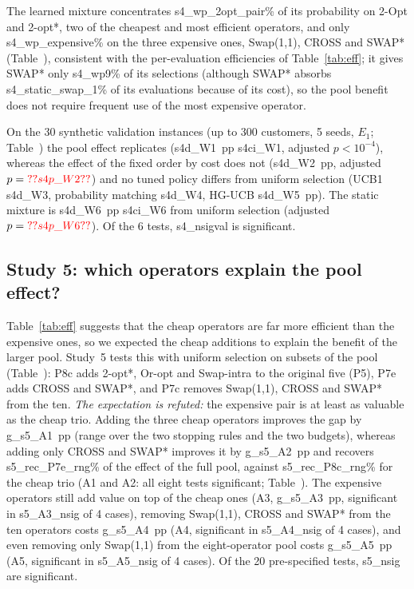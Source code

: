 The learned mixture concentrates \num{s4_wp_2opt_pair}\% of its probability on 2-Opt and 2-opt*, two of the cheapest and most efficient operators, and only \num{s4_wp_expensive}\% on the three expensive ones, Swap(1,1), CROSS and SWAP* (Table~), consistent with the per-evaluation efficiencies of Table~\ref{tab:eff}; it gives SWAP* only \num{s4_wp9}\% of its selections (although SWAP* absorbs \num{s4_static_swap_1}\% of its evaluations because of its cost), so the pool benefit does not require frequent use of the most expensive operator.

On the 30 synthetic validation instances (up to 300 customers, 5 seeds, $E_1$; Table~) the pool effect replicates (\num{s4d_W1}~pp \num{s4ci_W1}, adjusted $p<10^{-4}$), whereas the effect of the fixed order by cost does not (\num{s4d_W2}~pp, adjusted $p=\num{s4p_W2}$) and no tuned policy differs from uniform selection (UCB1 \num{s4d_W3}, probability matching \num{s4d_W4}, HG-UCB \num{s4d_W5}~pp). The static mixture is \num{s4d_W6}~pp \num{s4ci_W6} from uniform selection (adjusted $p=\num{s4p_W6}$). Of the 6 tests, \num{s4_nsigval} is significant.

\subsection{Study 5: which operators explain the pool effect?}\label{sec:s5}
Table~\ref{tab:eff} suggests that the cheap operators are far more efficient than the expensive ones, so we expected the cheap additions to explain the benefit of the larger pool. Study~5 tests this with uniform selection on subsets of the pool (Table~): P8c adds 2-opt*, Or-opt and Swap-intra to the original five (P5), P7e adds CROSS and SWAP*, and P7c removes Swap(1,1), CROSS and SWAP* from the ten. \emph{The expectation is refuted:} the expensive pair is at least as valuable as the cheap trio. Adding the three cheap operators improves the gap by \num{g_s5_A1}~pp (range over the two stopping rules and the two budgets), whereas adding only CROSS and SWAP* improves it by \num{g_s5_A2}~pp and recovers \num{s5_rec_P7e_rng}\% of the effect of the full pool, against \num{s5_rec_P8c_rng}\% for the cheap trio (A1 and A2: all eight tests significant; Table~). The expensive operators still add value on top of the cheap ones (A3, \num{g_s5_A3}~pp, significant in \num{s5_A3_nsig} of 4 cases), removing Swap(1,1), CROSS and SWAP* from the ten operators costs \num{g_s5_A4}~pp (A4, significant in \num{s5_A4_nsig} of 4 cases), and even removing only Swap(1,1) from the eight-operator pool costs \num{g_s5_A5}~pp (A5, significant in \num{s5_A5_nsig} of 4 cases). Of the 20 pre-specified tests, \num{s5_nsig} are significant.



